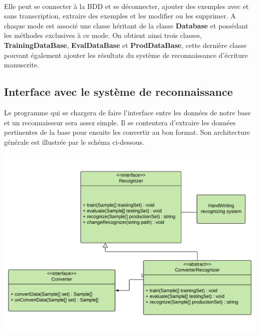 \paragraph{}

Elle peut se connecter à la BDD et se déconnecter, ajouter des exemples avec
et sans transcription, extraire des exemples et les modifier ou les supprimer.
A chaque mode est associé une classe héritant de la classe \textbf{Database}
et possédant les méthodes exclusives à ce mode. On obtient ainsi trois
classes, \textbf{TrainingDataBase}, \textbf{EvalDataBase} et
\textbf{ProdDataBase}, cette dernière classe pouvant également ajouter les
résultats du système de reconnaissance d'écriture manuscrite.

\subsection{Interface avec le système de reconnaissance}

Le programme qui se chargera de faire l’interface entre les données de notre
base et un reconnaisseur sera assez simple. Il se contentera d’extraire les
données pertinentes de la base pour ensuite les convertir au bon format.
Son architecture générale est illustrée par le schéma ci-dessous.

\newpage

\begin{mdframed}[frametitle={Figure 14 : Diagramme de classes de l'interface avec le système de reconaissance d'écriture manuscrite}, innerbottommargin=10]
\begin{center}
\includegraphics[scale=0.5]{interface-reconnaisseur.pdf}
\end{center}
\end{mdframed}

